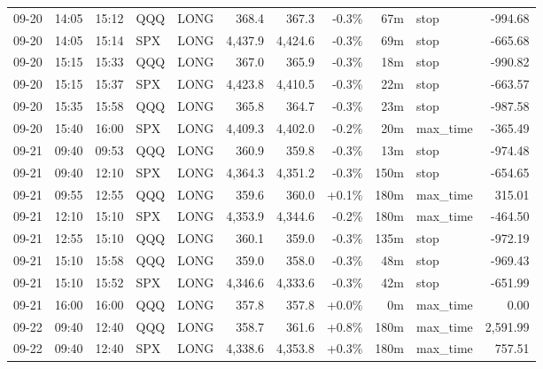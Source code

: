 \documentclass[11pt,a4paper,twoside]{article}
\begin{document}
\begin{center}
\begin{longtable}{>{\color{txtmain}}l l l l l r r r r >{\color{txtmain}}l r}
09-20 & 14:05 & 15:12 & QQQ & LONG & 368.4 & 367.3 & \textcolor{lossred}{-0.3\%} & 67m & stop & \textcolor{lossred}{-994.68} \\
09-20 & 14:05 & 15:14 & SPX & LONG & 4,437.9 & 4,424.6 & \textcolor{lossred}{-0.3\%} & 69m & stop & \textcolor{lossred}{-665.68} \\
09-20 & 15:15 & 15:33 & QQQ & LONG & 367.0 & 365.9 & \textcolor{lossred}{-0.3\%} & 18m & stop & \textcolor{lossred}{-990.82} \\
09-20 & 15:15 & 15:37 & SPX & LONG & 4,423.8 & 4,410.5 & \textcolor{lossred}{-0.3\%} & 22m & stop & \textcolor{lossred}{-663.57} \\
09-20 & 15:35 & 15:58 & QQQ & LONG & 365.8 & 364.7 & \textcolor{lossred}{-0.3\%} & 23m & stop & \textcolor{lossred}{-987.58} \\
09-20 & 15:40 & 16:00 & SPX & LONG & 4,409.3 & 4,402.0 & \textcolor{lossred}{-0.2\%} & 20m & max\_time & \textcolor{lossred}{-365.49} \\
09-21 & 09:40 & 09:53 & QQQ & LONG & 360.9 & 359.8 & \textcolor{lossred}{-0.3\%} & 13m & stop & \textcolor{lossred}{-974.48} \\
09-21 & 09:40 & 12:10 & SPX & LONG & 4,364.3 & 4,351.2 & \textcolor{lossred}{-0.3\%} & 150m & stop & \textcolor{lossred}{-654.65} \\
09-21 & 09:55 & 12:55 & QQQ & LONG & 359.6 & 360.0 & \textcolor{wingreen}{+0.1\%} & 180m & max\_time & \textcolor{wingreen}{315.01} \\
09-21 & 12:10 & 15:10 & SPX & LONG & 4,353.9 & 4,344.6 & \textcolor{lossred}{-0.2\%} & 180m & max\_time & \textcolor{lossred}{-464.50} \\
09-21 & 12:55 & 15:10 & QQQ & LONG & 360.1 & 359.0 & \textcolor{lossred}{-0.3\%} & 135m & stop & \textcolor{lossred}{-972.19} \\
09-21 & 15:10 & 15:58 & QQQ & LONG & 359.0 & 358.0 & \textcolor{lossred}{-0.3\%} & 48m & stop & \textcolor{lossred}{-969.43} \\
09-21 & 15:10 & 15:52 & SPX & LONG & 4,346.6 & 4,333.6 & \textcolor{lossred}{-0.3\%} & 42m & stop & \textcolor{lossred}{-651.99} \\
09-21 & 16:00 & 16:00 & QQQ & LONG & 357.8 & 357.8 & \textcolor{wingreen}{+0.0\%} & 0m & max\_time & \textcolor{wingreen}{0.00} \\
09-22 & 09:40 & 12:40 & QQQ & LONG & 358.7 & 361.6 & \textcolor{wingreen}{+0.8\%} & 180m & max\_time & \textcolor{wingreen}{2,591.99} \\
09-22 & 09:40 & 12:40 & SPX & LONG & 4,338.6 & 4,353.8 & \textcolor{wingreen}{+0.3\%} & 180m & max\_time & \textcolor{wingreen}{757.51} \\

\end{longtable}
\end{center}
\end{document}
